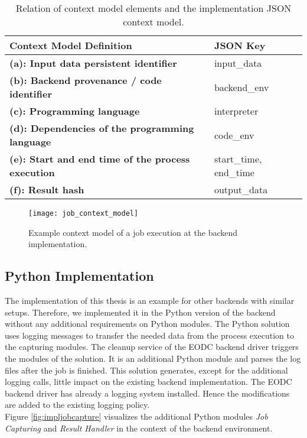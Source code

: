 \documentclass[draft,final]{vutinfth} %
\begin{document}
\begin{table}[]
	\caption{Relation of context model elements and the implementation JSON context model.}
	\begin{tabular}{l|l}
		\textbf{Context Model Definition} & \textbf{JSON Key} \\ \hline
		\textbf{(a): Input data persistent identifier} & input\_data \\ \hline
		\textbf{(b): Backend provenance / code identifier} & backend\_env \\ \hline
		\textbf{(c): Programming language} & interpreter \\ \hline
		\textbf{(d): Dependencies of the programming language} & code\_env \\ \hline
		\textbf{(e): Start and end time of the process execution} & start\_time, end\_time \\ \hline
		\textbf{(f): Result hash} & output\_data \\ %
	\end{tabular}
\label{Tab:contextmodel}
\end{table}

\begin{figure}[h]
	\centering
	\texttt{[image: job\_context\_model]}
	\caption{Example context model of a job execution at the backend implementation.}
	\label{fig:job_context_model} %
\end{figure}

\subsection{Python Implementation}\label{Implementation:Python Implementation}
The implementation of this thesis is an example for other backends with similar setups. Therefore, we implemented it in the Python version of the backend without any additional {requirements on Python modules}. The Python solution uses logging messages to transfer the needed data from the process execution to the capturing modules. The cleanup service of the EODC backend driver triggers the modules of the solution. It is an additional Python module and parses the log files after the job is finished. This solution generates, except for the additional logging calls, little impact on the existing backend implementation. The EODC backend driver has already a logging system installed. Hence the modifications are added to the existing logging policy. \\
Figure \ref{fig:impljobcapture} visualizes the additional Python modules \textit{Job Capturing} and \textit{Result Handler} in the context of the backend environment. 
\end{document}
